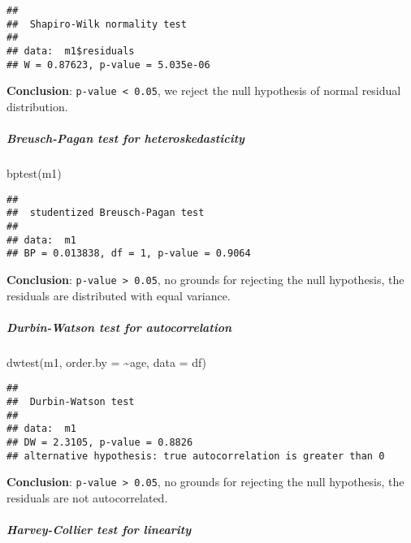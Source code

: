 \documentclass[
]{article}
\newenvironment{Shaded}{\begin{snugshade}}{\end{snugshade}}
\newcommand{\AttributeTok}[1]{\textcolor[rgb]{0.77,0.63,0.00}{#1}}
\newcommand{\FunctionTok}[1]{\textcolor[rgb]{0.00,0.00,0.00}{#1}}
\newcommand{\NormalTok}[1]{#1}
\newcommand{\SpecialCharTok}[1]{\textcolor[rgb]{0.00,0.00,0.00}{#1}}
\begin{document}
\begin{verbatim}
## 
##  Shapiro-Wilk normality test
## 
## data:  m1$residuals
## W = 0.87623, p-value = 5.035e-06
\end{verbatim}

\textbf{Conclusion}: \texttt{p-value\ \textless{}\ 0.05}, we reject the
null hypothesis of normal residual distribution.

\hypertarget{breusch-pagan-test-for-heteroskedasticity}{%
\subparagraph{Breusch-Pagan test for
heteroskedasticity}\label{breusch-pagan-test-for-heteroskedasticity}}

\begin{Shaded}
\begin{Highlighting}[]
\FunctionTok{bptest}\NormalTok{(m1)}
\end{Highlighting}
\end{Shaded}

\begin{verbatim}
## 
##  studentized Breusch-Pagan test
## 
## data:  m1
## BP = 0.013838, df = 1, p-value = 0.9064
\end{verbatim}

\textbf{Conclusion}: \texttt{p-value\ \textgreater{}\ 0.05}, no grounds
for rejecting the null hypothesis, the residuals are distributed with
equal variance.

\hypertarget{durbin-watson-test-for-autocorrelation}{%
\subparagraph{Durbin-Watson test for
autocorrelation}\label{durbin-watson-test-for-autocorrelation}}

\begin{Shaded}
\begin{Highlighting}[]
\FunctionTok{dwtest}\NormalTok{(m1, }\AttributeTok{order.by =} \SpecialCharTok{\textasciitilde{}}\NormalTok{age, }\AttributeTok{data =}\NormalTok{ df)}
\end{Highlighting}
\end{Shaded}

\begin{verbatim}
## 
##  Durbin-Watson test
## 
## data:  m1
## DW = 2.3105, p-value = 0.8826
## alternative hypothesis: true autocorrelation is greater than 0
\end{verbatim}

\textbf{Conclusion}: \texttt{p-value\ \textgreater{}\ 0.05}, no grounds
for rejecting the null hypothesis, the residuals are not autocorrelated.

\hypertarget{harvey-collier-test-for-linearity}{%
\subparagraph{Harvey-Collier test for
linearity}\label{harvey-collier-test-for-linearity}}
\end{document}
